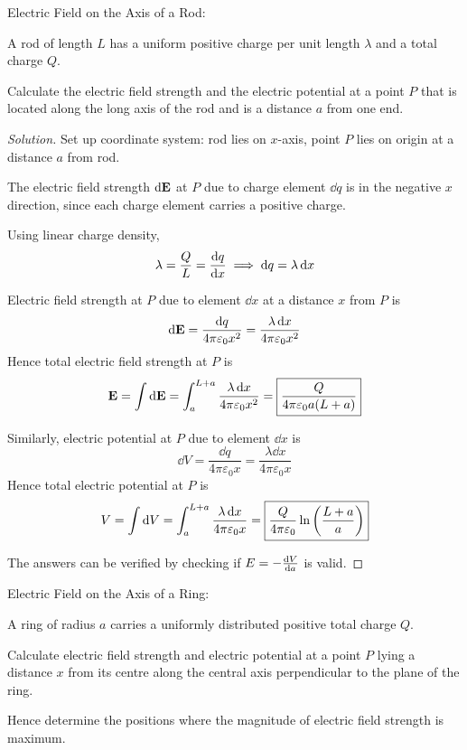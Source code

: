 Electric Field on the Axis of a Rod:
\begin{exmp}
A rod of length $L$ has a uniform positive charge per unit length $\lambda$ and a total charge $Q$. 

Calculate the electric field strength and the electric potential at a point $P$ that is located along the long axis of the rod and is a distance $a$ from one end.
\end{exmp}


\begin{proof}[Solution]
Set up coordinate system: rod lies on $x$-axis, point $P$ lies on origin at a distance $a$ from rod.

The electric field strength $\dd{\vb{E}}$ at $P$ due to charge element $\dd{q}$ is in the negative $x$ direction, since each charge element carries a positive charge.

Using linear charge density,
\[ \lambda = \frac{Q}{L} = \odv{q}{x} \implies \dd{q}=\lambda\dd{x} \]

Electric field strength at $P$ due to element $\dd{x}$ at a distance $x$ from $P$ is 
\[ \dd{\vb{E}} = \frac{\dd{q}}{4\pi\varepsilon_0x^2} = \frac{\lambda\dd{x}}{4\pi\varepsilon_0x^2} \]
Hence total electric field strength at $P$ is
\[ \vb{E} = \int \dd{\vb{E}} = \int_a^{L+a}\frac{\lambda\dd{x}}{4\pi\varepsilon_0x^2} = \boxed{\frac{Q}{4\pi\varepsilon_0a(L+a)}} \]

Similarly, electric potential at $P$ due to element $\dd{x}$ is 
\[ \dd{V} = \frac{\dd{q}}{4\pi\varepsilon_0x} = \frac{\lambda\dd{x}}{4\pi\varepsilon_0x} \]
Hence total electric potential at $P$ is
\[ V = \int \dd{V} = \int_a^{L+a} \frac{\lambda\dd{x}}{4\pi\varepsilon_0x} = \boxed{\frac{Q}{4\pi\varepsilon_0}\ln\left(\frac{L+a}{a}\right)} \]

The answers can be verified by checking if $E=-\odv{V}{a}$ is valid.
\end{proof}
\pagebreak

Electric Field on the Axis of a Ring:
\begin{exmp}
A ring of radius $a$ carries a uniformly distributed positive total charge $Q$. 

Calculate electric field strength and electric potential at a point $P$ lying a distance $x$ from its centre along the central axis perpendicular to the plane of the ring.

Hence determine the positions where the magnitude of electric field strength is maximum.
\end{exmp}

